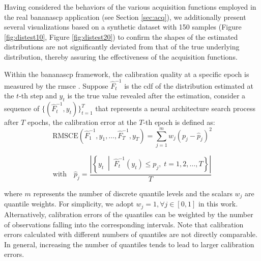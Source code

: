 \begin{description}[leftmargin=0cm, listparindent=\parindent]
Having considered the behaviors of the various acquisition functions employed in the real \gls{bananascp} application (see Section \ref{sec:acq}), we additionally present several visualizations based on a synthetic dataset with 150 samples (Figure \ref{fig:distest10}, Figure \ref{fig:distest20}) to confirm the shapes of the estimated distributions are not significantly deviated from that of the true underlying distribution, thereby assuring the effectiveness of the acquisition functions.

\vspace{1em}
\item[Evaluation Metrics] Within the \gls{bananascp} framework, the calibration quality at a specific epoch is measured by the \gls{rmsce} \cite{pmlr-v80-kuleshov18a}. Suppose $\hat{F}^{-1}_t$ is the \gls{cdf} of the distribution estimated at the  $t$-th step and $y_t$ is the true value revealed after the estimation, consider a sequence of $\{(\hat{F}^{-1}_t, y_t)\}_{t=1}^T$ that represents a neural architecture search process after $T$ epochs, the calibration error at the $T$-th epoch is defined as:
	\vspace{0.5em}
	\begin{equation}
	\text{RMSCE} \left( \hat{F}^{-1}_1, y_1, \dots, \hat{F}^{-1}_T, y_T \right) = \sum_{j=1}^m w_j \left( p_j - \hat{p}_j \right)^2
	\label{rmsce}
	\end{equation}

	\[
	\text{with} \quad
	\hat{p}_j = \frac{\left| \left\{ y_t \;\middle|\; \hat{F}^{-1}_t(y_t) \le p_j,\; t = 1, 2, \dots, T \right\} \right|}{T}
	\]

\noindent where $m$ represents the number of discrete quantile levels and the scalars $w_j$ are  quantile weights. For simplicity, we adopt  $w_j=1, \forall j \in[0,1]$ in this work. Alternatively, calibration errors of the quantiles can be weighted by the number of observations falling into the corresponding intervals. Note that calibration errors calculated with different numbers of quantiles are not directly comparable. In general, increasing the number of quantiles tends to lead to larger calibration errors.	
\end{description}



